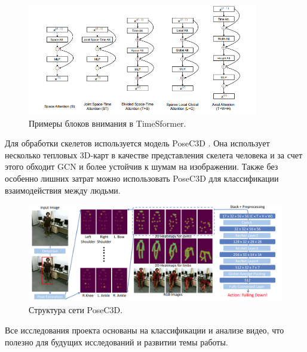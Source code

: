 \begin{figure}[h]
	\centering
	\includegraphics[width=0.9\textwidth]{./images/Classificators/TimeSformer}
	\caption{Примеры блоков внимания в TimeSformer. \cite{TimeSformer}}
	\label{fig:timesformer}
\end{figure}

Для обработки скелетов используется модель PoseC3D \cite{duan2021revisiting}. Она использует несколько тепловых 3D-карт в качестве представления скелета человека и за счет этого обходит GCN и более устойчив к шумам на изображении. Также без особенно лишних затрат можно использовать PoseC3D для классификации взаимодействия между людьми.

\begin{figure}[h]
	\centering
	\includegraphics[width=\textwidth]{./images/Classificators/PoseC3D}
	\caption{Структура сети PoseC3D. \cite{duan2021revisiting}}
	\label{fig:posec3d}
\end{figure}

Все исследования проекта основаны на классификации и анализе видео, что полезно для будущих исследований и развитии темы работы.


\newpage
